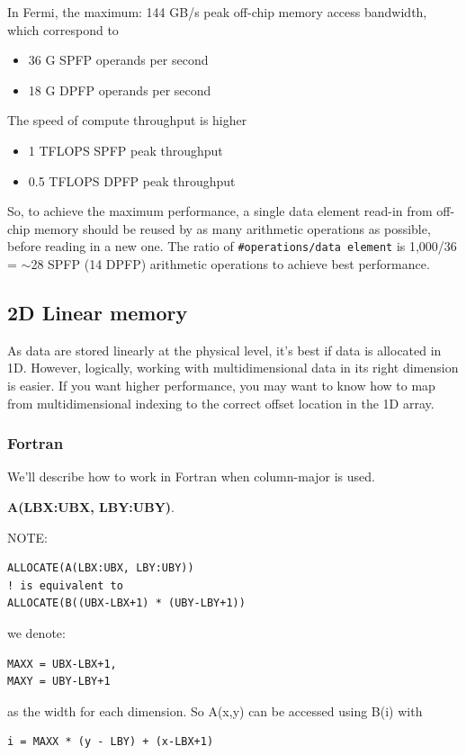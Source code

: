 In Fermi, the maximum: 144 GB/s peak off-chip memory access
bandwidth, which correspond to
\begin{itemize}
\item  36 G SPFP operands per second
\item  18 G DPFP operands per second
\end{itemize}
The speed of compute throughput is higher
\begin{itemize}
\item 1 TFLOPS SPFP peak throughput
\item 0.5 TFLOPS DPFP peak throughput
\end{itemize}
So, to achieve the maximum performance, a single data element
read-in from off-chip memory should be reused by as many arithmetic
operations as possible, before reading in a new one. The ratio of
\verb!#operations/data element! is 1,000/36 = $\sim$28 SPFP (14
DPFP) arithmetic operations to achieve best performance. 


\subsection{2D Linear memory }
\label{sec:linear-memory-}


As data are stored linearly at the physical level, it's best if data
is allocated in 1D. However, logically, working with multidimensional
data in its right dimension is easier. If you want higher performance,
you may want to know how to map from multidimensional indexing to the
correct offset location in the 1D array. 

\subsubsection{Fortran}
\label{sec:fortran-1}

We'll describe how to work in Fortran when column-major is used.

{\bf A(LBX:UBX, LBY:UBY)}.  

NOTE:
\begin{lstlisting}
ALLOCATE(A(LBX:UBX, LBY:UBY))
! is equivalent to
ALLOCATE(B((UBX-LBX+1) * (UBY-LBY+1))
\end{lstlisting}
we denote: 
\begin{verbatim}
MAXX = UBX-LBX+1, 
MAXY = UBY-LBY+1
\end{verbatim}
as the width for each dimension.  So A(x,y) can be accessed using B(i)
with
\begin{lstlisting}
i = MAXX * (y - LBY) + (x-LBX+1)
\end{lstlisting}


